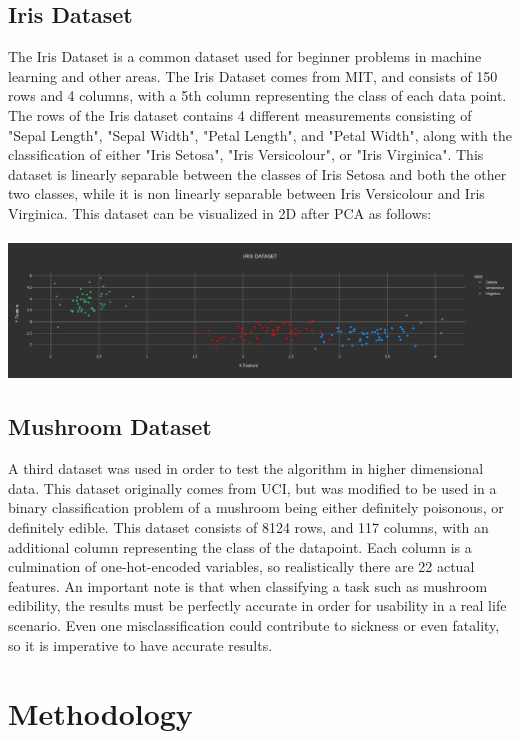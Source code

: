 \documentclass[12pt]{article}%
\begin{document}
	\subsection{Iris Dataset}
	The Iris Dataset is a common dataset used for beginner problems in machine learning and other areas.  The Iris Dataset comes from MIT, and consists of 150 rows and 4 columns, with a 5th column representing the class of each data point.  The rows of the Iris dataset contains 4 different measurements consisting of "Sepal Length", "Sepal Width", "Petal Length", and "Petal Width", along with the classification of either "Iris Setosa", "Iris Versicolour", or "Iris Virginica".  This dataset is linearly separable between the classes of Iris Setosa and both the other two classes, while it is non linearly separable between Iris Versicolour and Iris Virginica.  This dataset can be visualized in 2D after PCA as follows:\\\\
	\indent\indent\includegraphics[scale=.2]{./iris.png}
	
	\subsection{Mushroom Dataset}
	A third dataset was used in order to test the algorithm in higher dimensional data.  This dataset originally comes from UCI, but was modified to be used in a binary classification problem of a mushroom being either definitely poisonous, or definitely edible.  This dataset consists of 8124 rows, and 117 columns, with an additional column representing the class of the datapoint.  Each column is a culmination of one-hot-encoded variables, so realistically there are 22 actual features.  An important note is that when classifying a task such as mushroom edibility, the results must be perfectly accurate in order for usability in a real life scenario.  Even one misclassification could contribute to sickness or even fatality, so it is imperative to have accurate results.
	
	\section{Methodology}
\end{document}
